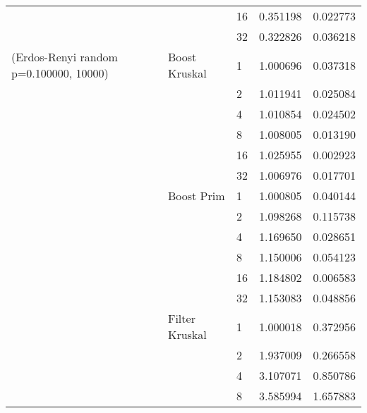 \begin{tabular}{lllrr}
                                                       &                     & 16 &  0.351198 &  0.022773 \\
                                                       &                     & 32 &  0.322826 &  0.036218 \\
(Erdos-Renyi random p=0.100000, 10000) & Boost Kruskal & 1  &  1.000696 &  0.037318 \\
                                                       &                     & 2  &  1.011941 &  0.025084 \\
                                                       &                     & 4  &  1.010854 &  0.024502 \\
                                                       &                     & 8  &  1.008005 &  0.013190 \\
                                                       &                     & 16 &  1.025955 &  0.002923 \\
                                                       &                     & 32 &  1.006976 &  0.017701 \\
                                                       & Boost Prim & 1  &  1.000805 &  0.040144 \\
                                                       &                     & 2  &  1.098268 &  0.115738 \\
                                                       &                     & 4  &  1.169650 &  0.028651 \\
                                                       &                     & 8  &  1.150006 &  0.054123 \\
                                                       &                     & 16 &  1.184802 &  0.006583 \\
                                                       &                     & 32 &  1.153083 &  0.048856 \\
                                                       & Filter Kruskal & 1  &  1.000018 &  0.372956 \\
                                                       &                     & 2  &  1.937009 &  0.266558 \\
                                                       &                     & 4  &  3.107071 &  0.850786 \\
                                                       &                     & 8  &  3.585994 &  1.657883 \\

\end{tabular}
